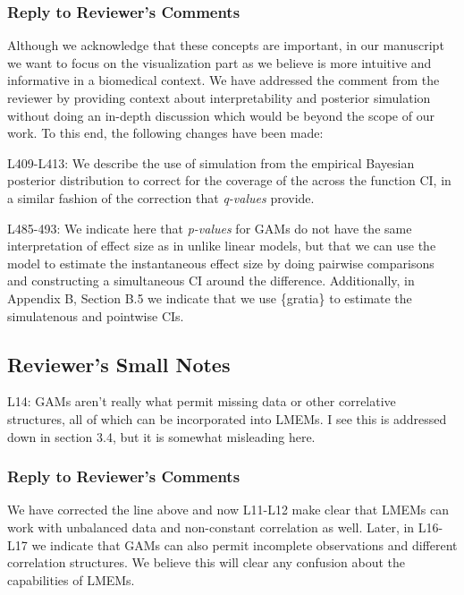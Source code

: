 \documentclass[
]{article}
\begin{document}
\hypertarget{section-40}{%
\subsubsection{\texorpdfstring{\textcolor{reviewersblue} {Reply to Reviewer's Comments}}{}}\label{section-40}}

Although we acknowledge that these concepts are important, in our manuscript we want to focus on the visualization part as we believe is more intuitive and informative in a biomedical context. We have addressed the comment from the reviewer by providing context about interpretability and posterior simulation without doing an in-depth discussion which would be beyond the scope of our work.
To this end, the following changes have been made:

L409-L413: We describe the use of simulation from the empirical Bayesian posterior distribution to correct for the coverage of the across the function CI, in a similar fashion of the correction that \emph{q-values} provide.

L485-493: We indicate here that \emph{p-values} for GAMs do not have the same interpretation of effect size as in unlike linear models, but that we can use the model to estimate the instantaneous effect size by doing pairwise comparisons and constructing a simultaneous CI around the difference. Additionally, in Appendix B, Section B.5 we indicate that we use \{gratia\} to estimate the simulatenous and pointwise CIs.

\hypertarget{reviewers-small-notes}{%
\subsection{Reviewer's Small Notes}\label{reviewers-small-notes}}

L14: GAMs aren't really what permit missing data or other correlative structures, all of which can be incorporated into LMEMs. I see this is addressed down in section 3.4, but it is somewhat misleading here.

\hypertarget{section-41}{%
\subsubsection{\texorpdfstring{\textcolor{reviewersblue} {Reply to Reviewer's Comments}}{}}\label{section-41}}

We have corrected the line above and now L11-L12 make clear that LMEMs can work with unbalanced data and non-constant correlation as well. Later, in L16-L17 we indicate that GAMs can also permit incomplete observations and different correlation structures. We believe this will clear any confusion about the capabilities of LMEMs.
\end{document}
